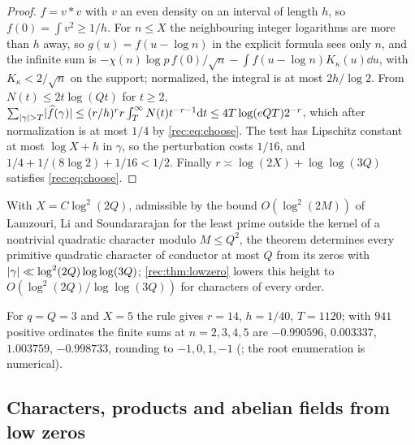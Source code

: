 \begin{proof}
$f=v*v$ with $v$ an even density on an interval of length $h$, so $f(0)=\int v^2\ge1/h$. For $n\le X$
the neighbouring integer logarithms are more than $h$ away, so $g(u)=f(u-\log n)$ in the explicit
formula sees only $n$, and the infinite sum is $-\chi(n)\log p\,f(0)/\sqrt n-\int f(u-\log n)K_\kappa(u)\dd u$,
with $K_\kappa<2/\sqrt n$ on the support; normalized, the integral is at most $2h/\log2$. From
$N(t)\le2t\log(Qt)$ for $t\ge2$,
$\sum_{\lvert\gamma\rvert>T}\lvert\widehat f(\gamma)\rvert\le(r/h)^rr\int_T^\infty N(t)t^{-r-1}\mathrm{d} t\le4T\log(eQT)2^{-r}$,
which after normalization is at most $1/4$ by \eqref{rec:eq:choose}. The test has Lipschitz constant
at most $\log X+h$ in $\gamma$, so the perturbation costs $1/16$, and
$1/4+1/(8\log2)+1/16<1/2$. Finally $r\asymp\log(2X)+\log\log(3Q)$ satisfies \eqref{rec:eq:choose}.
\end{proof}

With $X=C\log^2(2Q)$, admissible by the bound $O(\log^2(2M))$ of Lamzouri, Li and Soundararajan
\cite[Theorem~1.1]{LamzouriLiSoundararajan2015Conditional} for the least prime outside the kernel of a
nontrivial quadratic character modulo $M\le Q^2$, the theorem determines every primitive quadratic
character of conductor at most $Q$ from its zeros with $\lvert\gamma\rvert\ll\log^2(2Q)\log\log(3Q)$;
\cref{rec:thm:lowzero} lowers this height to $O(\log^2(2Q)/\log\log(3Q))$ for characters of every order.

For $q=Q=3$ and $X=5$ the rule gives $r=14$, $h=1/40$, $T=1120$; with $941$ positive ordinates the
finite sums at $n=2,3,4,5$ are $-0.990596$, $0.003337$, $1.003759$, $-0.998733$, rounding to
$-1,0,1,-1$ (; the root enumeration is numerical).

\subsection{Characters, products and abelian fields from low zeros}\label{rec:sec:lowzero}

